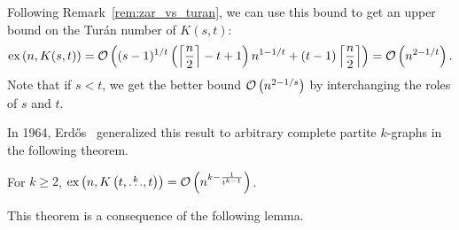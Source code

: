 \begin{remark}
    Following Remark~\ref{rem:zar_vs_turan}, we can use this bound to get an upper bound on the Turán number of $K(s, t)$:
    \[
        \text{ex} \left( n, K(s, t) \right) =
        \mathcal{O}\left((s - 1)^{1 / t}\left(\left\lceil\frac{n}{2}\right\rceil - t + 1\right)n^{1 - 1 / t} + (t - 1)\left\lceil\frac{n}{2}\right\rceil\right) =
        \mathcal{O}\left(n^{2 - 1 / t}\right).
    \]
    Note that if $s < t$, we get the better bound $\mathcal{O}\left(n^{2 - 1 / s}\right)$ by interchanging the roles of $s$ and $t$.
\end{remark}

In 1964, Erdős~\cite{Erods1964} generalized this result to arbitrary complete partite $k$-graphs in the following theorem.

\begin{theorem}\label{thm:erdos64}
    For $k \geq 2$,
    $\text{ex} \left( n, K\left(t, \overset{k}{\dots}, t\right) \right) = \mathcal{O}\left(n^{k - \frac{1}{t^{k-1}}}\right)$.
\end{theorem}

This theorem is a consequence of the following lemma.


